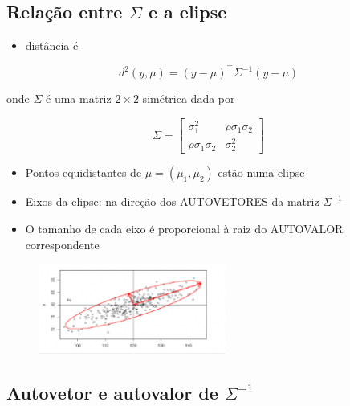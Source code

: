 \documentclass[
  letterpaper,
  DIV=11,
  numbers=noendperiod]{scrartcl}
\providecommand{\tightlist}{%
  \setlength{\itemsep}{0pt}\setlength{\parskip}{0pt}}\usepackage{longtable,booktabs,array}
\begin{document}
\hypertarget{relauxe7uxe3o-entre-sigma-e-a-elipse}{%
\subsection{\texorpdfstring{Relação entre \(\Sigma\) e a
elipse}{Relação entre \textbackslash Sigma e a elipse}}\label{relauxe7uxe3o-entre-sigma-e-a-elipse}}

\begin{itemize}
\tightlist
\item
  distância é
\end{itemize}

\[ d^2(y,\mu) = (y-\mu)^\top \Sigma^{-1}(y-\mu)\]

onde \(\Sigma\) é uma matriz \(2\times 2\) simétrica dada por

\[ \Sigma = \begin{bmatrix}\sigma_1^2 & \rho\sigma_1\sigma_2\\ \rho\sigma_1\sigma_2 & \sigma_2^2\end{bmatrix}\]

\begin{itemize}
\tightlist
\item
  Pontos equidistantes de \(\mu = (\mu_1, \mu_2)\) estão numa elipse
\item
  Eixos da elipse: na direção dos AUTOVETORES da matriz \(\Sigma^{-1}\)
\item
  O tamanho de cada eixo é proporcional à raiz do AUTOVALOR
  correspondente
\end{itemize}

\begin{figure}

{\centering \includegraphics[width=0.55\textwidth,height=\textheight]{figs/Aula07/eigen_cov.png}

}

\end{figure}

\hypertarget{autovetor-e-autovalor-de-sigma-1}{%
\subsection{\texorpdfstring{Autovetor e autovalor de
\(\Sigma^{-1}\)}{Autovetor e autovalor de \textbackslash Sigma\^{}\{-1\}}}\label{autovetor-e-autovalor-de-sigma-1}}
\end{document}
